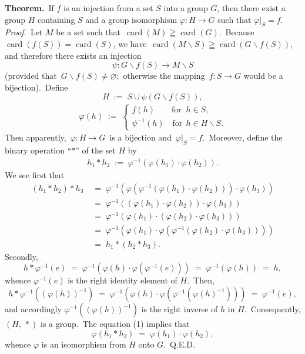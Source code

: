 \documentclass[12pt]{article}
\theoremstyle{definition}
\DeclareMathOperator{\card}{card}
\begin{document}

\textbf{Theorem.}\, If $f$ is an injection from a set $S$ into a group $G$, then there exist a group $H$ containing $S$ and a group isomorphism \;$\varphi\!:H \to G$\; such that\; $\varphi|_S = f$.\\

\emph{Proof.}\, Let $M$ be a set such that\, $\card(M) \geqq \card(G)$.\, Because\, $\card(f(S)) = \card(S)$, we have\, 
$\card(M\!\smallsetminus\!S) \geqq \card(G\!\smallsetminus\!f(S))$,\, and therefore there exists an injection
$$\psi\!:G\!\smallsetminus\!f(S) \to M\!\smallsetminus\!S$$
(provided that\, $G\!\smallsetminus\!f(S) \neq \varnothing$;\, otherwise the mapping \,$f\!:S \to G$ would be a bijection).\, Define
$$H \;:=\; S\cup\psi(G\!\smallsetminus\!f(S)),$$
\begin{align*}
\varphi(h) \;:=\; 
\begin{cases}
f(h) \qquad\mbox{for}\;\; h \in S,\\
\psi^{-1}(h) \quad\mbox{for}\;\, h \in H\!\smallsetminus\!S.
\end{cases}
\end{align*}
Then apparently,\, $\varphi\!:H \to G$\, is a bijection and\, $\varphi|_S = f$.\, Moreover, define the binary operation ``$*$'' of the set $H$ by
\begin{align}
h_1\ast h_2 \;:=\; \varphi^{-1}(\varphi(h_1)\!\cdot\!\varphi(h_2)).
\end{align}
We see first that
\begin{align*}
(h_1\ast h_2)\ast h_3 &\;=\; 
\varphi^{-1}\!\left(\varphi\left(\varphi^{-1}(\varphi(h_1)\!\cdot\!\varphi(h_2))\right)\!\cdot\!\varphi(h_3)\right)\\
                      &\;=\; \varphi^{-1}((\varphi(h_1)\!\cdot\!\varphi(h_2))\!\cdot\!\varphi(h_3))\\
                      &\;=\; \varphi^{-1}(\varphi(h_1)\!\cdot\!(\varphi(h_2)\!\cdot\!\varphi(h_3)))\\ &\;=\; 
\varphi^{-1}\!\left(\varphi(h_1)\!\cdot\!\varphi\left(\varphi^{-1}(\varphi(h_2)\!\cdot\!\varphi(h_3))\right)\right)\\
                      &\;=\; h_1\ast(h_2\ast h_3).
\end{align*}
Secondly,
$$h\ast\varphi^{-1}(e) \;=\; 
\varphi^{-1}\!\left(\varphi(h)\!\cdot\!\varphi(\varphi^{-1}(e))\right) \;=\; \varphi^{-1}(\varphi(h)) \;=\; h,$$
whence $\varphi^{-1}(e)$ is the right identity element of $H$.\, Then,
$$h\ast \varphi^{-1}\!\left((\varphi(h))^{-1}\right) 
\;=\; \varphi^{-1}\left(\varphi(h)\!\cdot\!\varphi\left(\varphi^{-1}(\varphi(h)^{-1})\right)\right) \;=\; \varphi^{-1}(e),$$
and accordingly $\displaystyle\varphi^{-1}\!\left((\varphi(h))^{-1}\right)$ is the right inverse of $h$ in $H$.\, Consequently, 
$(H,\,\ast)$ is a group.\, The equation (1) implies that
$$\varphi(h_1\ast h_2) \;=\; \varphi(h_1)\!\cdot\!\varphi(h_2),$$
whence $\varphi$ is an isomorphism from $H$ onto $G$.\, Q.E.D.

\end{document}
